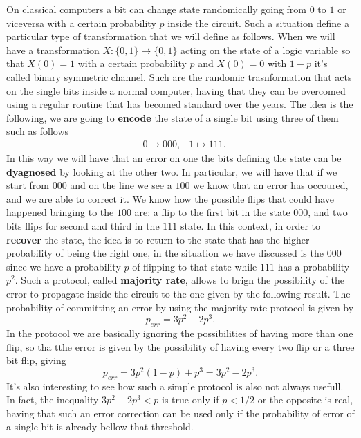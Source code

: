 On classical computers a bit can change state randomically going from $0$ to $1$ or viceversa with a certain probability $p$ inside the circuit. Such a situation define a particular type of transformation that we will define as follows.
{
    When we will have a transformation $X:\{0,1\} \to \{0,1\}$ acting on the state of a logic variable so that $X(0) = 1$ with a certain probability $p$ and $X(0) = 0$ with $1-p$ it's called binary symmetric channel.
}
\noindent
Such are the randomic trasnformation that acts on the single bits inside a normal computer, having that they can be overcomed using a regular routine that has becomed standard over the years. The idea is the following, we are going to \textbf{encode} the state of a single bit using three of them such as follows
\begin{align}
    &0 \mapsto 000, &1\mapsto 111.
\end{align}
In this way we will have that an error on one the bits defining the state can be \textbf{dyagnosed} by looking at the other two. In particular, we will have that if we start from $000$ and on the line we see a $100$ we know that an error has occoured, and we are able to correct it. We know how the possible flips that could have happened bringing to the $100$ are: a flip to the first bit in the state $000$, and two bits flips for second and third in the $111$ state. In this context, in order to \textbf{recover} the state, the idea is to return to the state that has the higher probability of being the right one, in the situation we have discussed is the $000$ since we have a probability $p$ of flipping to that state while $111$ has a probability $p^2$. Such a protocol, called \textbf{majority rate}, allows to brign the possibility of the error to propagate inside the circuit to the one given by the following result.
{
    The probability of committing an error by using the majority rate protocol is given by
    \begin{equation}
        \label{eq:ErrMajoRate}
        p_{err} = 3p^2 - 2p^3.
    \end{equation}
}
{
    In the protocol we are basically ignoring the possibilities of having more than one flip, so tha tthe error is given by the possibility of having every two flip or a three bit flip, giving
    \begin{equation}
        p_{err} = 3p^2(1-p) + p^3 = 3p^2 - 2p^3.
    \end{equation}
}
\noindent
It's also interesting to see how such a simple protocol is also not always usefull. In fact, the inequality $3p^2 - 2p^3 < p$ is true only if $p < 1/2$ or the opposite is real, having that such an error correction can be used only if the probability of error of a single bit is already bellow that threshold.

